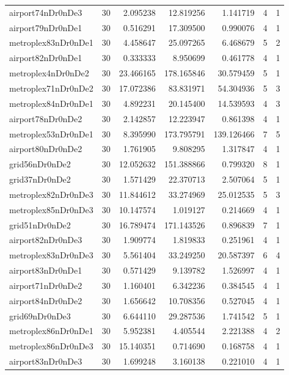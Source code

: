\begin{longtable}{|l|r|r|r|r|r|r|}
airport74nDr0nDe3 & 30 & 2.095238 & 12.819256 & 1.141719 & 4 & 1 \\
airport79nDr0nDe1 & 30 & 0.516291 & 17.309500 & 0.990076 & 4 & 1 \\
metroplex83nDr0nDe1 & 30 & 4.458647 & 25.097265 & 6.468679 & 5 & 2 \\
airport82nDr0nDe1 & 30 & 0.333333 & 8.950699 & 0.461778 & 4 & 1 \\
metroplex4nDr0nDe2 & 30 & 23.466165 & 178.165846 & 30.579459 & 5 & 1 \\
metroplex71nDr0nDe2 & 30 & 17.072386 & 83.831971 & 54.304936 & 5 & 3 \\
metroplex84nDr0nDe1 & 30 & 4.892231 & 20.145400 & 14.539593 & 4 & 3 \\
airport78nDr0nDe2 & 30 & 2.142857 & 12.223947 & 0.861398 & 4 & 1 \\
metroplex53nDr0nDe1 & 30 & 8.395990 & 173.795791 & 139.126466 & 7 & 5 \\
airport80nDr0nDe2 & 30 & 1.761905 & 9.808295 & 1.317847 & 4 & 1 \\
grid56nDr0nDe2 & 30 & 12.052632 & 151.388866 & 0.799320 & 8 & 1 \\
grid37nDr0nDe2 & 30 & 1.571429 & 22.370713 & 2.507064 & 5 & 1 \\
metroplex82nDr0nDe3 & 30 & 11.844612 & 33.274969 & 25.012535 & 5 & 3 \\
metroplex85nDr0nDe3 & 30 & 10.147574 & 1.019127 & 0.214669 & 4 & 1 \\
grid51nDr0nDe2 & 30 & 16.789474 & 171.143526 & 0.896839 & 7 & 1 \\
airport82nDr0nDe3 & 30 & 1.909774 & 1.819833 & 0.251961 & 4 & 1 \\
metroplex83nDr0nDe3 & 30 & 5.561404 & 33.249250 & 20.587397 & 6 & 4 \\
airport83nDr0nDe1 & 30 & 0.571429 & 9.139782 & 1.526997 & 4 & 1 \\
airport71nDr0nDe2 & 30 & 1.160401 & 6.342236 & 0.384545 & 4 & 1 \\
airport84nDr0nDe2 & 30 & 1.656642 & 10.708356 & 0.527045 & 4 & 1 \\
grid69nDr0nDe3 & 30 & 6.644110 & 29.287536 & 1.741542 & 5 & 1 \\
metroplex86nDr0nDe1 & 30 & 5.952381 & 4.405544 & 2.221388 & 4 & 2 \\
metroplex86nDr0nDe3 & 30 & 15.140351 & 0.714690 & 0.168758 & 4 & 1 \\
airport83nDr0nDe3 & 30 & 1.699248 & 3.160138 & 0.221010 & 4 & 1 \\

\end{longtable}
